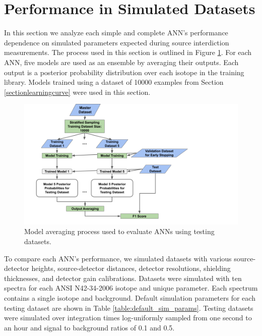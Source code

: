 \section{Performance in Simulated Datasets} \label{simulated_dataset_performance}

In this section we analyze each simple and complete ANN's performance dependence on simulated parameters expected during source interdiction measurements. The process used in this section is outlined in Figure \ref{fig:generalization_performance_diagram}. For each ANN, five models are used as an ensemble by averaging their outputs. Each output is a posterior probability distribution over each isotope in the training library. Models trained using a dataset of 10000 examples from Section \ref{sectionlearningcurve} were used in this section.

\begin{figure}[H]
	\centering
	\includegraphics[trim=0 0 210 0,clip,width=1.0\linewidth]{images/generalization_performance_diagram}
	\caption{Model averaging process used to evaluate ANNs using testing datasets.}
	\label{fig:generalization_performance_diagram}
\end{figure}

To compare each ANN's performance, we simulated datasets with various source-detector heights, source-detector distances, detector resolutions, shielding thicknesses, and detector gain calibrations. Datasets were simulated with ten spectra for each ANSI N42-34-2006 isotope and unique parameter. Each spectrum contains a single isotope and background. Default simulation parameters for each testing dataset are shown in Table \ref{table:default_sim_params}. Testing datasets were simulated over integration times log-uniformly sampled from one second to an hour and signal to background ratios of 0.1 and 0.5.

